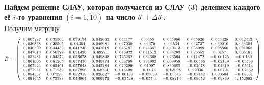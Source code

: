 \documentclass[12pt]{article}
\begin{document}
\textbf{Найдем решение СЛАУ, которая получается из СЛАУ (3) делением каждого её
$i$-го уравнения  $(i=\overline{1,10})$
на число
$b^i + \Delta b^i $. } \\
Получим матрицу 
\begin{equation*}
\scriptsize
B =  \left(
\begin{array}{cccccccccc}
	0,605287 & 0,035506 & 0,039134 & 0,042042 & 0,044177 & 0,0455 & 0,045986 & 0,045626 & 0,044428 & 0,042412 \\
	0,036358 & 0,628505 & 0,04394 & 0,046081 & 0,047039 & 0,04679 & 0,04534 & 0,042727 & 0,039016 & 0,034304 \\
	0,040522 & 0,044432 & 0,641246 & 0,047619 & 0,046787 & 0,044357 & 0,040413 & 0,035089 & 0,028566 & 0,021068 \\
	0,047013 & 0,050322 & 0,051426 & 0,69221 & 0,046922 & 0,041512 & 0,034283 & 0,025552 & 0,0157 & 0,005161 \\
	0,052481 & 0,054572 & 0,053678 & 0,049848 & 0,725262 & 0,034368 & 0,023564 & 0,011472 & -0,00125 & -0,0139 \\
	0,061005 & 0,061265 & 0,057436 & 0,049774 & 0,038789 & 0,794902 & 0,009958 & -0,00596 & -0,02149 & -0,03558 \\
	0,067924 & 0,065401 & 0,057648 & 0,045284 & 0,029299 & 0,01097 & 0,839685 & -0,02678 & -0,04319 & -0,05614 \\
	0,077954 & 0,071289 & 0,057896 & 0,03904 & 0,016499 & -0,0076 & -0,03098 & 0,92936 & -0,06704 & -0,07632 \\
	0,084257 & 0,07226 & 0,052319 & 0,026627 & -0,00199 & -0,03039 & -0,05545 & -0,07442 & 1,003504 & -0,08661 \\
	0,091645 & 0,072388 & 0,043964 & 0,009972 & -0,02528 & -0,05734 & -0,08213 & -0,09652 & -0,09869 & 1,152082		
\end{array}
\right)
\end{equation*}
\end{document}
